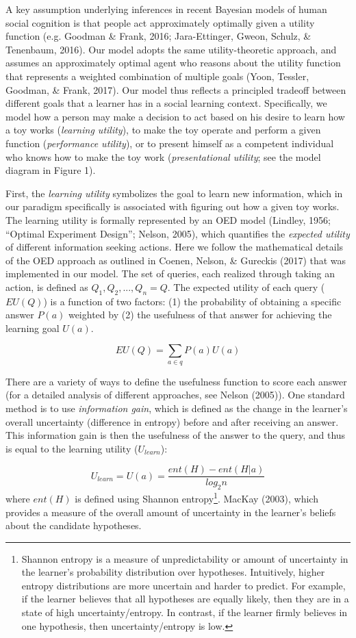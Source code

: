 \documentclass[10pt, letterpaper]{article}
\begin{document}
A key assumption underlying inferences in recent Bayesian models of
human social cognition is that people act approximately optimally given
a utility function (e.g. Goodman \& Frank, 2016; Jara-Ettinger, Gweon,
Schulz, \& Tenenbaum, 2016). Our model adopts the same utility-theoretic
approach, and assumes an approximately optimal agent who reasons about
the utility function that represents a weighted combination of multiple
goals (Yoon, Tessler, Goodman, \& Frank, 2017). Our model thus reflects
a principled tradeoff between different goals that a learner has in a
social learning context. Specifically, we model how a person may make a
decision to act based on his desire to learn how a toy works
(\emph{learning utility}), to make the toy operate and perform a given
function (\emph{performance utility}), or to present himself as a
competent individual who knows how to make the toy work
(\emph{presentational utility}; see the model diagram in Figure 1).

First, the \emph{learning utility} symbolizes the goal to learn new
information, which in our paradigm specifically is associated with
figuring out how a given toy works. The learning utility is formally
represented by an OED model (Lindley, 1956; ``Optimal Experiment
Design''; Nelson, 2005), which quantifies the \emph{expected utility} of
different information seeking actions. Here we follow the mathematical
details of the OED approach as outlined in Coenen, Nelson, \& Gureckis
(2017) that was implemented in our model. The set of queries, each
realized through taking an action, is defined as
\(Q_1, Q_2, ..., Q_n = {Q}\). The expected utility of each query
(\(EU(Q)\)) is a function of two factors: (1) the probability of
obtaining a specific answer \(P(a)\) weighted by (2) the usefulness of
that answer for achieving the learning goal \(U(a)\).

\[EU(Q) = \sum_{a\in q}{P(a)U(a)}\]

There are a variety of ways to define the usefulness function to score
each answer (for a detailed analysis of different approaches, see Nelson
(2005)). One standard method is to use \emph{information gain}, which is
defined as the change in the learner's overall uncertainty (difference
in entropy) before and after receiving an answer. This information gain
is then the usefulness of the answer to the query, and thus is equal to
the learning utility (\(U_{learn}\)):

\[ U_{learn} = U(a) = \frac{ent(H) - ent(H|a)}{log_2n}\] \noindent
where \(ent(H)\) is defined using Shannon
entropy\footnote{Shannon entropy is a measure of unpredictability or amount of uncertainty in the learner's probability distribution over hypotheses. Intuitively, higher entropy distributions are more uncertain and harder to predict. For example, if the learner believes that all hypotheses are equally likely, then they are in a state of high uncertainty/entropy. In contrast, if the learner firmly believes in one hypothesis, then uncertainty/entropy is low.}.
MacKay (2003), which provides a measure of the overall amount of
uncertainty in the learner's beliefs about the candidate hypotheses.
\end{document}
